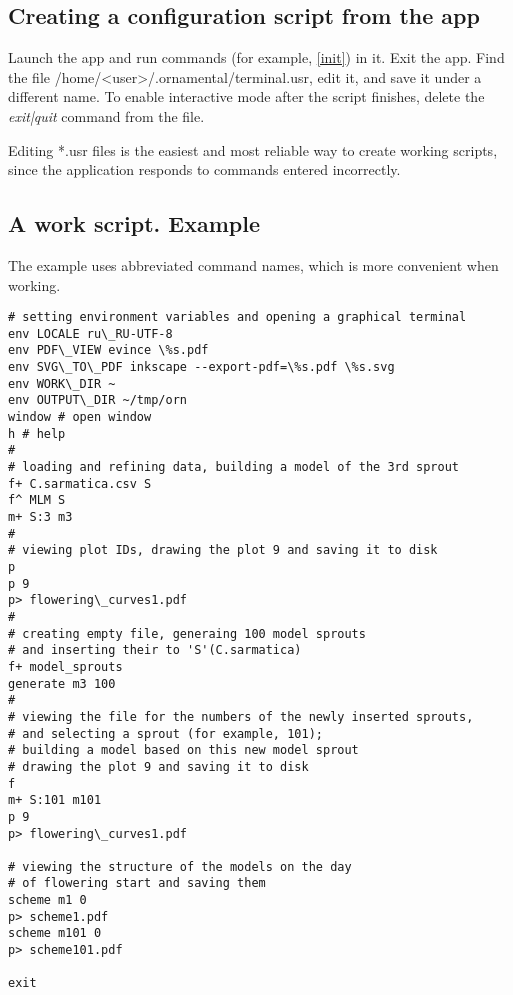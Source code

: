 \documentclass[a4paper]{article}
\begin{document}
\subsection{Creating a configuration script from the app}
Launch the app and run commands (for example, \ref{init}) in it. Exit the app. Find the file /home/<user>/.ornamental/terminal.usr, edit it, and save it under a different name. To enable interactive mode after the script finishes, delete the \textit{exit|quit} command from the file.

Editing *.usr files is the easiest and most reliable way to create working scripts, since the application responds to commands entered incorrectly.

\subsection{A work script. Example}

The example uses abbreviated command names, which is more convenient when working.

\begin{lstlisting}
# setting environment variables and opening a graphical terminal
env LOCALE ru\_RU-UTF-8
env PDF\_VIEW evince \%s.pdf
env SVG\_TO\_PDF inkscape --export-pdf=\%s.pdf \%s.svg
env WORK\_DIR ~ 
env OUTPUT\_DIR ~/tmp/orn 
window # open window
h # help 
#
# loading and refining data, building a model of the 3rd sprout
f+ C.sarmatica.csv S
f^ MLM S
m+ S:3 m3
#
# viewing plot IDs, drawing the plot 9 and saving it to disk
p 
p 9                                            
p> flowering\_curves1.pdf
#
# creating empty file, generaing 100 model sprouts 
# and inserting their to 'S'(C.sarmatica)
f+ model_sprouts
generate m3 100     
#
# viewing the file for the numbers of the newly inserted sprouts, 
# and selecting a sprout (for example, 101); 
# building a model based on this new model sprout
# drawing the plot 9 and saving it to disk 
f
m+ S:101 m101
p 9
p> flowering\_curves1.pdf

# viewing the structure of the models on the day 
# of flowering start and saving them
scheme m1 0
p> scheme1.pdf
scheme m101 0
p> scheme101.pdf

exit
\end{lstlisting}
\end{document}
